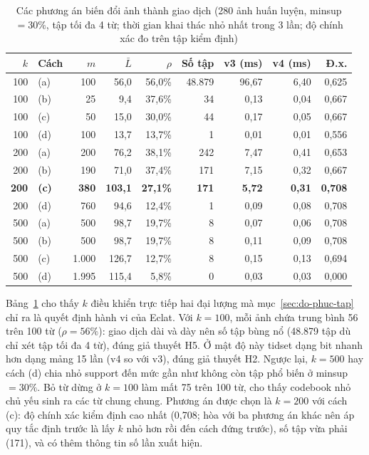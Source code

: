 \begin{table}[t]
\caption{Các phương án biến đổi ảnh thành giao dịch (280 ảnh huấn luyện, minsup $= 30\%$, tập tối đa 4 từ; thời gian khai thác nhỏ nhất trong 3 lần; độ chính xác đo trên tập kiểm định)}
\label{tab:b11}
\centering
\scriptsize
\setlength{\tabcolsep}{2.4pt}
\begin{tabular}{@{}rlrrrrrrr@{}}
\toprule
$k$ & Cách & $m$ & $\bar{L}$ & $\rho$ & Số tập & v3 (ms) & v4 (ms) & Đ.x. \\
\midrule
100 & (a) & 100 & 56,0 & 56,0\% & 48.879 & 96,67 & 6,40 & 0,625 \\
100 & (b) & 25 & 9,4 & 37,6\% & 34 & 0,13 & 0,04 & 0,667 \\
100 & (c) & 50 & 15,0 & 30,0\% & 44 & 0,17 & 0,05 & 0,667 \\
100 & (d) & 100 & 13,7 & 13,7\% & 1 & 0,01 & 0,01 & 0,556 \\
200 & (a) & 200 & 76,2 & 38,1\% & 242 & 7,47 & 0,41 & 0,653 \\
200 & (b) & 190 & 71,0 & 37,4\% & 171 & 7,15 & 0,32 & 0,667 \\
\textbf{200} & \textbf{(c)} & \textbf{380} & \textbf{103,1} & \textbf{27,1\%} & \textbf{171} & \textbf{5,72} & \textbf{0,31} & \textbf{0,708} \\
200 & (d) & 760 & 94,6 & 12,4\% & 1 & 0,09 & 0,08 & 0,708 \\
500 & (a) & 500 & 98,7 & 19,7\% & 8 & 0,07 & 0,06 & 0,708 \\
500 & (b) & 500 & 98,7 & 19,7\% & 8 & 0,11 & 0,09 & 0,708 \\
500 & (c) & 1.000 & 126,7 & 12,7\% & 8 & 0,15 & 0,13 & 0,694 \\
500 & (d) & 1.995 & 115,4 & 5,8\% & 0 & 0,03 & 0,03 & 0,000 \\
\bottomrule
\end{tabular}
\end{table}

Bảng~\ref{tab:b11} cho thấy $k$ điều khiển trực tiếp hai đại lượng mà mục~\ref{sec:do-phuc-tap} chỉ ra là quyết định hành vi của Eclat. Với $k = 100$, mỗi ảnh chứa trung bình 56 trên 100 từ ($\rho = 56\%$): giao dịch dài và dày nên số tập bùng nổ (48.879 tập dù chỉ xét tập tối đa 4 từ), đúng giả thuyết H5. Ở mật độ này tidset dạng bit nhanh hơn dạng mảng 15 lần (v4 so với v3), đúng giả thuyết H2. Ngược lại, $k = 500$ hay cách (d) chia nhỏ support đến mức gần như không còn tập phổ biến ở minsup $= 30\%$. Bỏ từ dừng ở $k = 100$ làm mất 75 trên 100 từ, cho thấy codebook nhỏ chủ yếu sinh ra các từ chung chung. Phương án được chọn là $k = 200$ với cách (c): độ chính xác kiểm định cao nhất (0,708; hòa với ba phương án khác nên áp quy tắc định trước là lấy $k$ nhỏ hơn rồi đến cách đứng trước), số tập vừa phải (171), và có thêm thông tin số lần xuất hiện.

